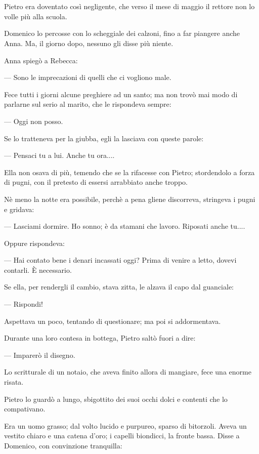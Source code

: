 \chapter{}

Pietro era doventato così negligente, che verso il mese di maggio il rettore non lo volle più alla scuola.

Domenico lo percosse con lo scheggiale dei calzoni, fino a far piangere anche Anna. Ma, il giorno dopo, nessuno gli disse più niente.

Anna spiegò a Rebecca:

— Sono le imprecazioni di quelli che ci vogliono male.

Fece tutti i giorni alcune preghiere ad un santo; ma non trovò mai modo di parlarne sul serio al marito, che le rispondeva sempre:

— Oggi non posso.

Se lo tratteneva per la giubba, egli la lasciava con queste parole:

— Pensaci tu a lui. Anche tu ora....

Ella non osava di più, temendo che se la rifacesse con Pietro; stordendolo a forza di pugni, con il pretesto di essersi arrabbiato anche troppo.

Nè meno la notte era possibile, perchè a pena gliene discorreva, stringeva i pugni e gridava:

— Lasciami dormire. Ho sonno; è da stamani che lavoro. Riposati anche tu....

Oppure rispondeva:

— Hai contato bene i denari incassati oggi? Prima di venire a letto, dovevi contarli. È necessario.

Se ella, per rendergli il cambio, stava zitta, le alzava il capo dal guanciale:

— Rispondi!

Aspettava un poco, tentando di questionare; ma poi si addormentava.

Durante una loro contesa in bottega, Pietro saltò fuori a dire:

— Imparerò il disegno.

Lo scritturale di un notaio, che aveva finito allora di mangiare, fece una enorme risata.

Pietro lo guardò a lungo, sbigottito dei suoi occhi dolci e contenti che lo compativano.

Era un uomo grasso; dal volto lucido e purpureo, sparso di bitorzoli. Aveva un vestito chiaro e una catena d'oro; i capelli biondicci, la fronte bassa. Disse a Domenico, con convinzione tranquilla:

